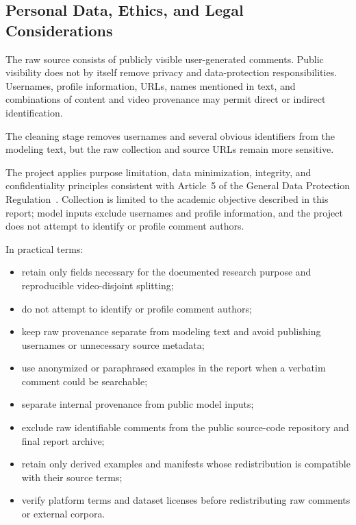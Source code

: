 \documentclass[12pt, a4paper, twoside, openany]{report}
\begin{document}
\subsection{Personal Data, Ethics, and Legal Considerations}

The raw source consists of publicly visible user-generated comments. Public visibility does not by itself remove privacy and data-protection responsibilities. Usernames, profile information, URLs, names mentioned in text, and combinations of content and video provenance may permit direct or indirect identification.

The cleaning stage removes usernames and several obvious identifiers from the modeling text, but the raw collection and source URLs remain more sensitive.

The project applies purpose limitation, data minimization, integrity, and confidentiality principles consistent with Article~5 of the General Data Protection Regulation~\cite{gdpr2016}. Collection is limited to the academic objective described in this report; model inputs exclude usernames and profile information, and the project does not attempt to identify or profile comment authors.

In practical terms:

\begin{itemize}
	\item retain only fields necessary for the documented research purpose and reproducible video-disjoint splitting;

	\item do not attempt to identify or profile comment authors;

	\item keep raw provenance separate from modeling text and avoid publishing usernames or unnecessary source metadata;

	\item use anonymized or paraphrased examples in the report when a verbatim comment could be searchable;

	\item separate internal provenance from public model inputs;

	\item exclude raw identifiable comments from the public source-code repository and final report archive;

	\item retain only derived examples and manifests whose redistribution is compatible with their source terms;

	\item verify platform terms and dataset licenses before redistributing raw comments or external corpora.
\end{itemize}
\end{document}
